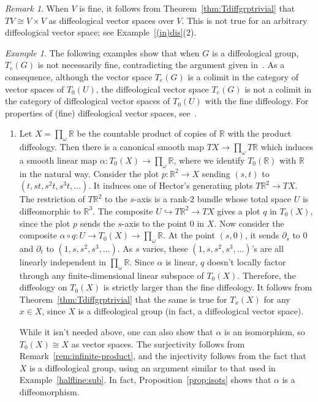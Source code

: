 \documentclass{amsart}
\theoremstyle{remark}
\newtheorem{rem}[de]{Remark}
\newtheorem{ex}[de]{Example}
\newcommand{\ra}{\to}
\def \R{\mathbb{R}}
\begin{document}
%
%

\begin{rem}
When $V$ is fine, it follows from Theorem~\ref{thm:Tdiffgrptrivial} that
$TV \cong V \times V$ as
diffeological vector spaces over $V$.
This is not true for an arbitrary diffeological vector space;
see Example~\ref{(in)dis}(2).
\end{rem}

\begin{ex}\label{ex:notfine}
The following examples show that when $G$ is a diffeological group,
$T_e(G)$ is not necessarily fine, contradicting the argument given
in~\cite[Proposition~6.8]{HM}.
As a consequence, although the vector space $T_e(G)$ is a colimit in the category
of vector spaces of $T_0(U)$, the diffeological vector space $T_e(G)$ is not a colimit in the category
of diffeological vector spaces of $T_0(U)$ with the fine diffeology.
For properties of (fine) diffeological vector spaces, see~\cite{Wu}.

\begin{enumerate}
\item \label{item:inftyprod} Let $X = \prod_\omega \R$ be the countable product of copies of $\R$
with the product diffeology.
Then there is a canonical smooth map $TX \ra \prod_\omega T \R$
which induces a smooth linear map $\alpha:T_0(X) \ra \prod_\omega \R$,
where we identify $T_0 (\R)$ with $\R$ in the natural way.
Consider the plot $p: \R^2 \to X$ sending $(s,t)$ to $(t, st, s^2t, s^3t, \ldots)$.
It induces one of Hector's generating plots $T\R^2 \to TX$.
The restriction of $T \R^2$ to the $s$-axis is a rank-$2$ bundle
whose total space $U$ is diffeomorphic to $\R^3$.
The composite $U \hookrightarrow T\R^2 \to TX$ gives a plot $q$ in $T_0(X)$,
since the plot $p$ sends the $s$-axis to the point $0$ in $X$.
Now consider the composite $\alpha \circ q: U \ra T_0(X) \ra \prod_\omega \R$.
At the point $(s,0)$, it sends $\partial_s$ to $0$
and $\partial_t$ to $(1, s, s^2, s^3, \ldots)$.
As $s$ varies, these $(1, s, s^2, s^3, \ldots)$'s are all
linearly independent in $\prod_\omega \R$.
Since $\alpha$ is linear,
$q$ doesn't locally factor through any finite-dimensional linear subspace of $T_0(X)$.
Therefore, the diffeology on $T_0(X)$ is strictly larger than the fine diffeology.
It follows from Theorem~\ref{thm:Tdiffgrptrivial} that the same is true for $T_x(X)$ for any $x \in X$,
since $X$ is a diffeological group (in fact, a diffeological vector space).

While it isn't needed above, one can also show that $\alpha$ is an
isomorphism, so $T_0(X) \cong X$ as vector spaces.
The surjectivity follows from Remark~\ref{rem:infinite-product},
and the injectivity follows from the fact that $X$ is a diffeological group,
using an argument similar to that used in Example~\ref{halfline:sub}.
%
In fact, Proposition~\ref{prop:isots} shows that $\alpha$ is a diffeomorphism.


\end{enumerate}
\end{ex}
\end{document}
